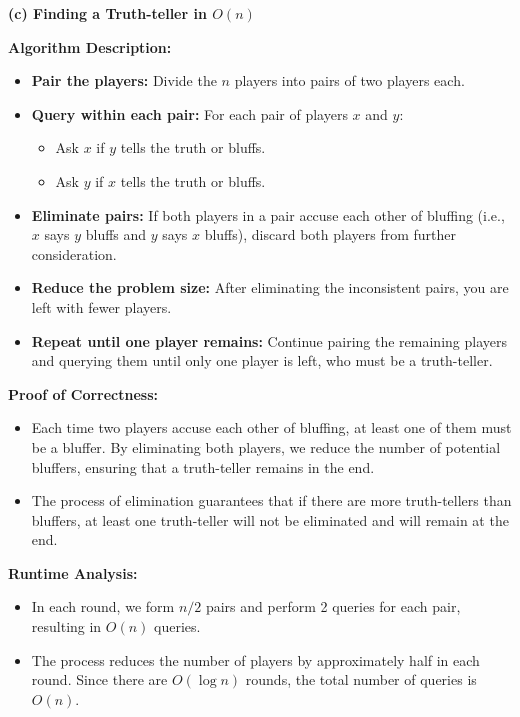 \documentclass[11pt]{article}
\begin{document}
\newpage
\textbf{(c) Finding a Truth-teller in \(O(n)\)}

\textbf{Algorithm Description:}
\begin{itemize}
    \item \textbf{Pair the players:} Divide the \(n\) players into pairs of two players each.
    \item \textbf{Query within each pair:} For each pair of players \(x\) and \(y\):
        \begin{itemize}
            \item Ask \(x\) if \(y\) tells the truth or bluffs.
            \item Ask \(y\) if \(x\) tells the truth or bluffs.
        \end{itemize}
    \item \textbf{Eliminate pairs:} If both players in a pair accuse each other of bluffing (i.e., \(x\) says \(y\) bluffs and \(y\) says \(x\) bluffs), discard both players from further consideration.
    \item \textbf{Reduce the problem size:} After eliminating the inconsistent pairs, you are left with fewer players.
    \item \textbf{Repeat until one player remains:} Continue pairing the remaining players and querying them until only one player is left, who must be a truth-teller.
\end{itemize}

\textbf{Proof of Correctness:}
\begin{itemize}
    \item Each time two players accuse each other of bluffing, at least one of them must be a bluffer. By eliminating both players, we reduce the number of potential bluffers, ensuring that a truth-teller remains in the end.
    \item The process of elimination guarantees that if there are more truth-tellers than bluffers, at least one truth-teller will not be eliminated and will remain at the end.
\end{itemize}

\textbf{Runtime Analysis:}
\begin{itemize}
    \item In each round, we form \(n/2\) pairs and perform 2 queries for each pair, resulting in \(O(n)\) queries.
    \item The process reduces the number of players by approximately half in each round. Since there are \(O(\log n)\) rounds, the total number of queries is \(O(n)\).
\end{itemize}
\end{document}
